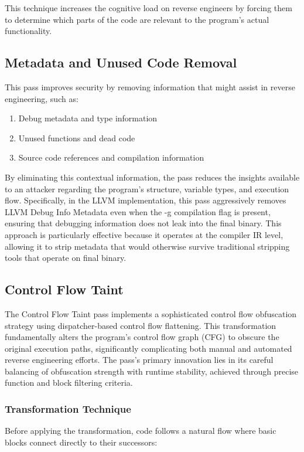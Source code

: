 \documentclass[conference]{IEEEtran}
\begin{document}
This technique increases the cognitive load on reverse engineers by forcing them to determine which parts of the code are relevant to the program's actual functionality.

\subsection{Metadata and Unused Code Removal}
This pass improves security by removing information that might assist in reverse engineering, such as:

\begin{enumerate}
    \item Debug metadata and type information
    \item Unused functions and dead code
    \item Source code references and compilation information
\end{enumerate}

By eliminating this contextual information, the pass reduces the insights available to an attacker regarding the program's structure, variable types, and execution flow. Specifically, in the LLVM implementation, this pass aggressively removes LLVM Debug Info Metadata even when the -g compilation flag is present, ensuring that debugging information does not leak into the final binary. This approach is particularly effective because it operates at the compiler IR level, allowing it to strip metadata that would otherwise survive traditional stripping tools that operate on final binary.

\subsection{Control Flow Taint}
The Control Flow Taint pass implements a sophisticated control flow obfuscation strategy using dispatcher-based control flow flattening. This transformation fundamentally alters the program's control flow graph (CFG) to obscure the original execution paths, significantly complicating both manual and automated reverse engineering efforts. The pass's primary innovation lies in its careful balancing of obfuscation strength with runtime stability, achieved through precise function and block filtering criteria.

\subsubsection{Transformation Technique}
Before applying the transformation, code follows a natural flow where basic blocks connect directly to their successors:
\end{document}
